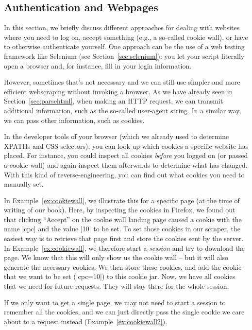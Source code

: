 \subsection{Authentication and Webpages}
\label{sec:authweb}
In this section, we briefly discuss different approaches for dealing
with websites where you need to log on, accept something (e.g., a
so-called cookie wall), or have to otherwise authenticate yourself.
One approach can be the use of a web testing framework like Selenium
(see Section~\ref{sec:selenium}): you let your script literally open a browser
and, for instance, fill in your login information.

However, sometimes that's not necessary and we can still use simpler
and more efficient webscraping without invoking a browser. As we have already
seen in Section~\ref{sec:parsehtml}, when making an HTTP request, we can transmit
additional information, such as the so-called user-agent string. In a
similar way, we can pass other information, such as cookies.

In the developer tools of your browser (which we already used to determine
XPATHs and CSS selectors), you can look up which cookies a specific website
has placed. For instance, you could inspect all cookies \emph{before} you
logged on (or passed a cookie wall) and again inspect them afterwards to
determine what has changed. With this kind of reverse-engineering, you
can find out what cookies you need to manually set.

In Example~\ref{ex:cookiewall}, we illustrate this for a specific page  (at the
time of writing of our book). Here, by inspecting the cookies in Firefox,
we found out that clicking ``Accept'' on the cookie wall landing page
caused a cookie with the name |cpc| and the value |10| to be set.   To set those cookies in our scraper, the easiest way is to retrieve that page first and store the cookies sent by the server. In Example~\ref{ex:cookiewall}, we therefore start a \emph{session}
and try to download the page. We know that this will only show us the
cookie wall -- but it will also generate the necessary cookies. We then
store these cookies, and add the cookie that we want to be set (|cpc=10|)
to this cookie jar. Now, we have all cookies that we need for future
requests. They will stay there for the whole session.

If we only want to get a single page, we may not need to start a session
to remember all the cookies, and we can just directly pass the single
cookie we care about to a request instead (Example~\ref{ex:cookiewall2}).




